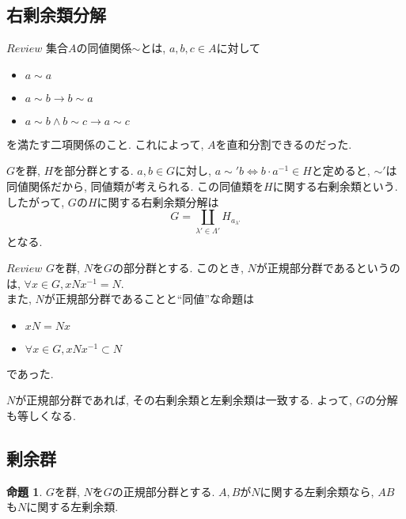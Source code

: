 \documentclass[a4j,dvipdfmx]{jsarticle}
\theoremstyle{definition}
\theoremstyle{definition}
\theoremstyle{definition}
\newtheorem{proposition}{命題}
\begin{document}
        \subsection*{右剰余類分解}
            \begin{itembox}[l]{$Review$}
                集合$A$の同値関係$\sim$とは, $a,b,c\in A$に対して
                \begin{itemize}
                    \item $a\sim a$
                    \item $a\sim b \rightarrow b\sim a$
                    \item $a\sim b \land b\sim c \rightarrow a\sim c$
                \end{itemize}
                を満たす二項関係のこと. これによって, $A$を直和分割できるのだった.
            \end{itembox}
            $G$を群, $H$を部分群とする. $a,b\in G$に対し, $a\sim' b\Leftrightarrow b\cdot a^{-1}\in H$と定めると, $\sim'$は同値関係だから, 
            同値類が考えられる. この同値類を$H$に関する右剰余類という. したがって, $G$の$H$に関する右剰余類分解は
            \begin{equation}
                G=\coprod_{\lambda'\in\Lambda'} H_{a_{\lambda'}}
            \end{equation}
            となる.
            \begin{itembox}[l]{$Review$}
                $G$を群, $N$を$G$の部分群とする. このとき, $N$が正規部分群であるというのは, $\forall x\in G, xNx^{-1}=N$.\\
                また, $N$が正規部分群であることと``同値''な命題は
                \begin{itemize}
                    \item $xN=Nx$
                    \item $\forall x\in G, xNx^{-1}\subset N$
                \end{itemize}
                であった.
            \end{itembox}
            $N$が正規部分群であれば, その右剰余類と左剰余類は一致する. よって, $G$の分解も等しくなる.
        \clearpage
        \subsection*{剰余群}
            \begin{proposition}
                $G$を群, $N$を$G$の正規部分群とする. $A,B$が$N$に関する左剰余類なら, $AB$も$N$に関する左剰余類.
            \end{proposition}
\end{document}
